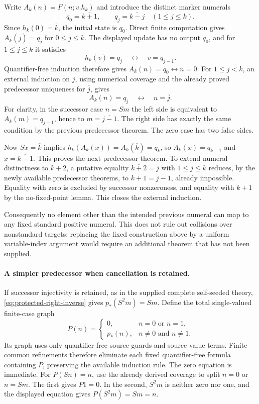 Write $A_k(n)=F(n;v.h_k)$ and introduce the distinct marker numerals
\[
 q_0=\overline{k+1},\qquad q_j=\overline{k-j}\quad(1\le j\le k).
\]
Since $h_k(0)=\overline{k}$, the initial state is $q_0$. Direct finite
computation gives $A_k(\overline{j})=q_j$ for $0\le j\le k$.
The displayed update has no output $q_0$, and for $1\le j\le k$ it
satisfies
\[
                       h_k(v)=q_j\quad\longleftrightarrow\quad v=q_{j-1}.
\]
Quantifier-free induction therefore gives
$A_k(n)=q_0\leftrightarrow n=0$. For $1\le j<k$, an external
induction on $j$, using numerical coverage and the already proved
predecessor uniqueness for $\overline{j}$, gives
\[
                     A_k(n)=q_j\quad\longleftrightarrow\quad n=\overline{j}.
\]
For clarity, in the successor case $n=Sm$ the left side is equivalent
to $A_k(m)=q_{j-1}$, hence to $m=\overline{j-1}$. The right side has
exactly the same condition by the previous predecessor theorem.
The zero case has two false sides.

Now $Sx=\overline{k}$ implies
$h_k(A_k(x))=A_k(\overline{k})=q_k$, so $A_k(x)=q_{k-1}$ and
$x=\overline{k-1}$. This proves the next predecessor theorem.
To extend numeral distinctness to $k+2$, a putative equality
$\overline{k+2}=\overline{j}$ with $1\le j\le k$ reduces, by the
newly available predecessor theorems, to
$\overline{k+1}=\overline{j-1}$, already impossible. Equality with
zero is excluded by successor nonzeroness, and equality with $k+1$
by the no-fixed-point lemma. This closes the external induction.

Consequently no element other than the intended previous numeral can
map to any fixed standard positive numeral. This does not rule out
collisions over nonstandard targets: replacing the fixed construction
above by a uniform variable-index argument would require an additional
theorem that has not been supplied.

\paragraph{A simpler predecessor when cancellation is retained.}
If successor injectivity is retained, as in the supplied complete
self-seeded theory, \eqref{eq:protected-right-inverse} gives
$p_*(S^2m)=Sm$. Define the total single-valued finite-case graph
\[
 P(n)=
 \begin{cases}
 0,&n=0\text{ or }n=1,\\
 p_*(n),&n\ne0\text{ and }n\ne1.
 \end{cases}
\]
Its graph uses only quantifier-free source guards and source value
terms. Finite common refinements therefore eliminate each fixed
quantifier-free formula containing $P$, preserving the available
induction rule. The zero equation is immediate. For $P(Sn)=n$,
use the already derived coverage to split $n=0$ or $n=Sm$.
The first gives $P1=0$. In the second, $S^2m$ is neither zero nor
one, and the displayed equation gives $P(S^2m)=Sm=n$.

